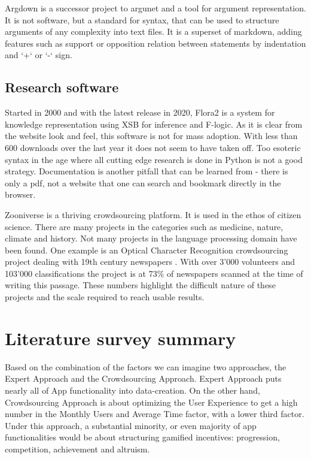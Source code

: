 \documentclass{report}
\begin{document}
Argdown \cite{noauthor_argdown_nodate} is a successor project to argunet and a tool for argument representation. It is not software, but a standard for syntax, that can be used to structure arguments of any complexity into text files. It is a superset of markdown, adding features such as support or opposition relation between statements by indentation and `+` or `-` sign.


\subsection{Research software}

Started in 2000 and with the latest release in 2020,
Flora2 \cite{noauthor_flora-2_nodate} is a system for knowledge representation using XSB for inference and F-logic.
As it is clear from the website look and feel, this software is not for mass adoption.
With less than 600 downloads over the last year \cite{noauthor_flora-2_nodate-4} it does not seem to have taken off.
Too esoteric syntax in the age where all cutting edge research is done in Python is not a good strategy. Documentation is another pitfall that can be learned from - there is only a pdf, not a website that one can search and bookmark directly in the browser. 

Zooniverse \cite{noauthor_zooniverse_nodate} is a thriving crowdsourcing platform. It is used in the ethos of citizen science. There are many projects in the categories such as medicine, nature, climate and history.  Not many projects in the language processing domain have been found. One example is an Optical Character Recognition crowdsourcing project dealing with 19th century newspapers \cite{noauthor_zooniverse_nodate-1}. With over 3'000 volunteers and 103'000 classifications the project is at 73\% of newspapers scanned at the time of writing this passage.
These numbers highlight the difficult nature of these projects and the scale required to reach usable results.

\section{Literature survey summary}

Based on the combination of the factors we can imagine two approaches, the Expert Approach and the Crowdsourcing Approach.  Expert Approach puts nearly all of App functionality into data-creation. 
On the other hand, Crowdsourcing Approach is about optimizing the User Experience to get a high number in the Monthly Users and Average Time factor, with a lower third factor.  Under this approach, a substantial minority, or even majority of app functionalities would be about structuring gamified incentives: progression, competition, achievement and altruism.
\end{document}
